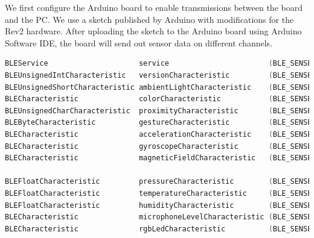 \documentclass{article}
\begin{document}
We first configure the Arduino board to enable transmissions between the board and the PC. We use a sketch published by Arduino with modifications for the Rev2 hardware. \cite{arduinoSketch} After uploading the sketch to the Arduino board using Arduino Software IDE, the board will send out sensor data on different channels.

\begin{lstlisting}[language=C, frame=single, breaklines=true]
BLEService                     service                       (BLE_SENSE_UUID("0000"));
BLEUnsignedIntCharacteristic   versionCharacteristic         (BLE_SENSE_UUID("1001"), BLERead);
BLEUnsignedShortCharacteristic ambientLightCharacteristic    (BLE_SENSE_UUID("2001"), BLENotify); // 16-bit
BLECharacteristic              colorCharacteristic           (BLE_SENSE_UUID("2002"), BLENotify, 3 * sizeof(unsigned short)); // Array of 16-bit, RGB
BLEUnsignedCharCharacteristic  proximityCharacteristic       (BLE_SENSE_UUID("2003"), BLENotify); // Byte, 0 - 255 => close to far
BLEByteCharacteristic          gestureCharacteristic         (BLE_SENSE_UUID("2004"), BLENotify); // NONE = -1, UP = 0, DOWN = 1, LEFT = 2, RIGHT = 3
BLECharacteristic              accelerationCharacteristic    (BLE_SENSE_UUID("3001"), BLENotify, 3 * sizeof(float)); // Array of 3 floats, G
BLECharacteristic              gyroscopeCharacteristic       (BLE_SENSE_UUID("3002"), BLENotify, 3 * sizeof(float)); // Array of 3 floats, dps
BLECharacteristic              magneticFieldCharacteristic   (BLE_SENSE_UUID("3003"), BLENotify, 3 * sizeof(float)); // Array of 3 floats, uT

BLEFloatCharacteristic         pressureCharacteristic        (BLE_SENSE_UUID("4001"), BLERead); // Float, kPa
BLEFloatCharacteristic         temperatureCharacteristic     (BLE_SENSE_UUID("4002"), BLERead); // Float, Celcius
BLEFloatCharacteristic         humidityCharacteristic        (BLE_SENSE_UUID("4003"), BLERead); // Float, Percentage
BLECharacteristic              microphoneLevelCharacteristic (BLE_SENSE_UUID("5001"), BLENotify, 32); // Int, RMS of audio input
BLECharacteristic              rgbLedCharacteristic          (BLE_SENSE_UUID("6001"), BLERead | BLEWrite, 3 * sizeof(byte)); // Array of 3 bytes, RGB
\end{lstlisting}
\end{document}

